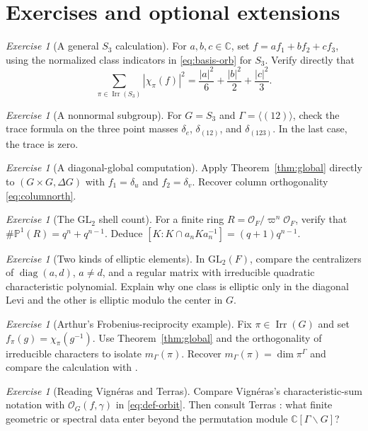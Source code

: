 \documentclass[12pt]{article}
\theoremstyle{remark}
\newtheorem{exercise}[theorem]{Exercise}
\newcommand{\C}{\mathbb C}
\newcommand{\Irr}{\operatorname{Irr}}
\newcommand{\Orb}{\mathcal O}
\begin{document}
\section{Exercises and optional extensions}
\begin{exercise}[A general $S_3$ calculation]
For $a,b,c\in\C$, set
$f=a f_1+b f_2+c f_3$, using the normalized class indicators
in \eqref{eq:basis-orb} for $S_3$. Verify directly that
\[
 \sum_{\pi\in\Irr(S_3)}|\chi_\pi(f)|^2
 =\frac{|a|^2}{6}+\frac{|b|^2}{2}+\frac{|c|^2}{3}.
\]
\end{exercise}
\begin{exercise}[A nonnormal subgroup]
For $G=S_3$ and $\Gamma=\langle(12)\rangle$,
check the trace formula on the three point masses
$\delta_e$, $\delta_{(12)}$, and $\delta_{(123)}$.
In the last case, the trace is zero.
\end{exercise}
\begin{exercise}[A diagonal-global computation]
Apply Theorem~\ref{thm:global} directly to
$(G\times G,\Delta G)$ with $f_1=\delta_u$ and
$f_2=\delta_v$. Recover column orthogonality
\eqref{eq:columnorth}.
\end{exercise}

\begin{exercise}[The $\mathrm{GL}_2$ shell count]
For a finite ring $R=\mathcal O_F/\varpi^n\mathcal O_F$,
verify that $\#\mathbb P^1(R)=q^n+q^{n-1}$. Deduce
$[K:K\cap a_nKa_n^{-1}]=(q+1)q^{n-1}$.
\end{exercise}
\begin{exercise}[Two kinds of elliptic elements]
In $\mathrm{GL}_2(F)$, compare the centralizers of
$\operatorname{diag}(a,d)$, $a\ne d$, and a regular matrix with
irreducible quadratic characteristic polynomial. Explain why
one class is elliptic only in the diagonal Levi and the other is
elliptic modulo the center in $G$.
\end{exercise}

\begin{exercise}[Arthur's Frobenius-reciprocity example]
Fix $\pi\in\Irr(G)$ and set
$f_\pi(g)=\chi_\pi(g^{-1})$. Use Theorem~\ref{thm:global}
and the orthogonality of irreducible characters to isolate
$m_\Gamma(\pi)$. Recover
$m_\Gamma(\pi)=\dim\pi^\Gamma$ and compare the calculation
with \cite[Example~2]{ArthurHecke1989}.
\end{exercise}
\begin{exercise}[Reading Vign\'eras and Terras]
Compare Vign\'eras's characteristic-sum notation
\cite[\S1.1]{Vigneras1991} with
$\Orb_G(f,\gamma)$ in \eqref{eq:def-orbit}.
Then consult Terras \cite[Ch.~22]{Terras1999}:
what finite geometric or spectral data enter beyond the
permutation module $\C[\Gamma\backslash G]$?
\end{exercise}
\end{document}
